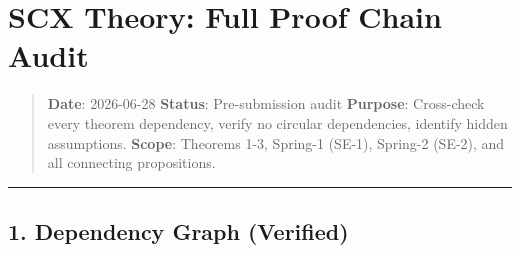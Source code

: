\documentclass[
  12pt,
]{ctexart}
\author{SCX}
\date{2026}
\begin{document}
\section{SCX Theory: Full Proof Chain
Audit}\label{scx-theory-full-proof-chain-audit}

\begin{quote}
\textbf{Date}: 2026-06-28 \textbar{} \textbf{Status}: Pre-submission
audit \textbf{Purpose}: Cross-check every theorem dependency, verify no
circular dependencies, identify hidden assumptions. \textbf{Scope}:
Theorems 1-3, Spring-1 (SE-1), Spring-2 (SE-2), and all connecting
propositions.
\end{quote}

\begin{center}\rule{0.5\linewidth}{0.5pt}\end{center}

\subsection{1. Dependency Graph
(Verified)}\label{dependency-graph-verified}
\end{document}
